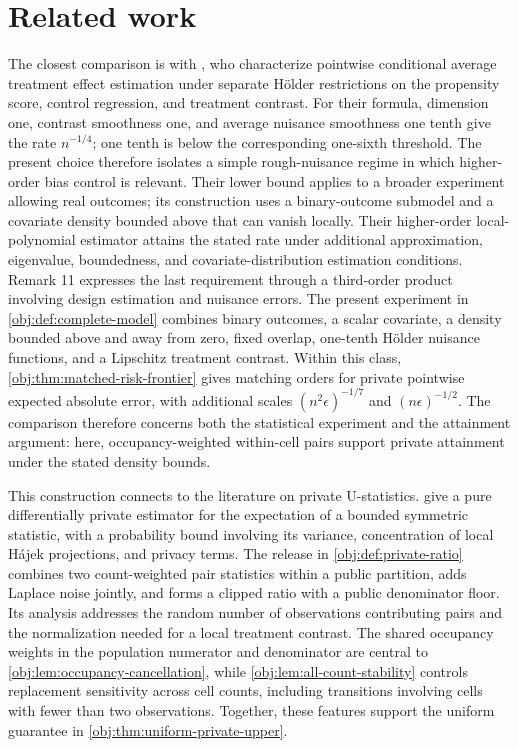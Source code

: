 \section{Related work}\label{sec:related-work}

The closest comparison is with \citet[][Theorems 1--2 and Remarks 2 and 11]{KennedyBalakrishnanRobinsWasserman2024}, who characterize pointwise conditional average treatment effect estimation under separate H\"older restrictions on the propensity score, control regression, and treatment contrast. For their formula, dimension one, contrast smoothness one, and average nuisance smoothness one tenth give the rate \(n^{-1/4}\); one tenth is below the corresponding one-sixth threshold. The present choice therefore isolates a simple rough-nuisance regime in which higher-order bias control is relevant. Their lower bound applies to a broader experiment allowing real outcomes; its construction uses a binary-outcome submodel and a covariate density bounded above that can vanish locally. Their higher-order local-polynomial estimator attains the stated rate under additional approximation, eigenvalue, boundedness, and covariate-distribution estimation conditions. Remark 11 expresses the last requirement through a third-order product involving design estimation and nuisance errors. The present experiment in \cref{obj:def:complete-model} combines binary outcomes, a scalar covariate, a density bounded above and away from zero, fixed overlap, one-tenth H\"older nuisance functions, and a Lipschitz treatment contrast. Within this class, \cref{obj:thm:matched-risk-frontier} gives matching orders for private pointwise expected absolute error, with additional scales \((n^2\epsilon)^{-1/7}\) and \((n\epsilon)^{-1/2}\). The comparison therefore concerns both the statistical experiment and the attainment argument: here, occupancy-weighted within-cell pairs support private attainment under the stated density bounds.

This construction connects to the literature on private U-statistics. \citet[][Theorem 2]{ChaudhuriLohPandeySarkar2024} give a pure differentially private estimator for the expectation of a bounded symmetric statistic, with a probability bound involving its variance, concentration of local H\'ajek projections, and privacy terms. The release in \cref{obj:def:private-ratio} combines two count-weighted pair statistics within a public partition, adds Laplace noise jointly, and forms a clipped ratio with a public denominator floor. Its analysis addresses the random number of observations contributing pairs and the normalization needed for a local treatment contrast. The shared occupancy weights in the population numerator and denominator are central to \cref{obj:lem:occupancy-cancellation}, while \cref{obj:lem:all-count-stability} controls replacement sensitivity across cell counts, including transitions involving cells with fewer than two observations. Together, these features support the uniform guarantee in \cref{obj:thm:uniform-private-upper}.

